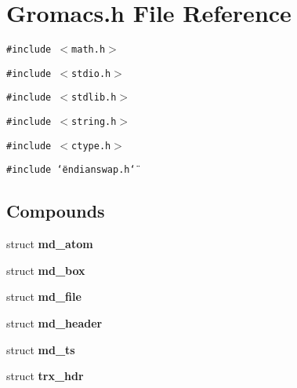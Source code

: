 \section{Gromacs.h File Reference}
\label{Gromacs_8h}
{\tt \#include $<$math.h$>$}\par
{\tt \#include $<$stdio.h$>$}\par
{\tt \#include $<$stdlib.h$>$}\par
{\tt \#include $<$string.h$>$}\par
{\tt \#include $<$ctype.h$>$}\par
{\tt \#include \char`\"{}endianswap.h\char`\"{}}\par
\subsection*{Compounds}
\begin{CompactItemize}
\item 
struct {\bf md\_\-atom}
\item 
struct {\bf md\_\-box}
\item 
struct {\bf md\_\-file}
\item 
struct {\bf md\_\-header}
\item 
struct {\bf md\_\-ts}
\item 
struct {\bf trx\_\-hdr}
\end{CompactItemize}
